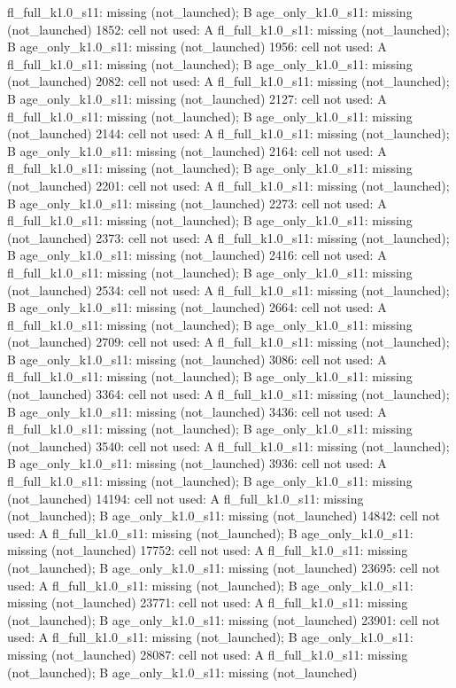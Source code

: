 \begin{table}[t]
{fl\_full\_k1.0\_s11: missing (not\_launched); B age\_only\_k1.0\_s11: missing (not\_launched) \textbar{} 1852: cell not used: A fl\_full\_k1.0\_s11: missing (not\_launched); B age\_only\_k1.0\_s11: missing (not\_launched) \textbar{} 1956: cell not used: A fl\_full\_k1.0\_s11: missing (not\_launched); B age\_only\_k1.0\_s11: missing (not\_launched) \textbar{} 2082: cell not used: A fl\_full\_k1.0\_s11: missing (not\_launched); B age\_only\_k1.0\_s11: missing (not\_launched) \textbar{} 2127: cell not used: A fl\_full\_k1.0\_s11: missing (not\_launched); B age\_only\_k1.0\_s11: missing (not\_launched) \textbar{} 2144: cell not used: A fl\_full\_k1.0\_s11: missing (not\_launched); B age\_only\_k1.0\_s11: missing (not\_launched) \textbar{} 2164: cell not used: A fl\_full\_k1.0\_s11: missing (not\_launched); B age\_only\_k1.0\_s11: missing (not\_launched) \textbar{} 2201: cell not used: A fl\_full\_k1.0\_s11: missing (not\_launched); B age\_only\_k1.0\_s11: missing (not\_launched) \textbar{} 2273: cell not used: A fl\_full\_k1.0\_s11: missing (not\_launched); B age\_only\_k1.0\_s11: missing (not\_launched) \textbar{} 2373: cell not used: A fl\_full\_k1.0\_s11: missing (not\_launched); B age\_only\_k1.0\_s11: missing (not\_launched) \textbar{} 2416: cell not used: A fl\_full\_k1.0\_s11: missing (not\_launched); B age\_only\_k1.0\_s11: missing (not\_launched) \textbar{} 2534: cell not used: A fl\_full\_k1.0\_s11: missing (not\_launched); B age\_only\_k1.0\_s11: missing (not\_launched) \textbar{} 2664: cell not used: A fl\_full\_k1.0\_s11: missing (not\_launched); B age\_only\_k1.0\_s11: missing (not\_launched) \textbar{} 2709: cell not used: A fl\_full\_k1.0\_s11: missing (not\_launched); B age\_only\_k1.0\_s11: missing (not\_launched) \textbar{} 3086: cell not used: A fl\_full\_k1.0\_s11: missing (not\_launched); B age\_only\_k1.0\_s11: missing (not\_launched) \textbar{} 3364: cell not used: A fl\_full\_k1.0\_s11: missing (not\_launched); B age\_only\_k1.0\_s11: missing (not\_launched) \textbar{} 3436: cell not used: A fl\_full\_k1.0\_s11: missing (not\_launched); B age\_only\_k1.0\_s11: missing (not\_launched) \textbar{} 3540: cell not used: A fl\_full\_k1.0\_s11: missing (not\_launched); B age\_only\_k1.0\_s11: missing (not\_launched) \textbar{} 3936: cell not used: A fl\_full\_k1.0\_s11: missing (not\_launched); B age\_only\_k1.0\_s11: missing (not\_launched) \textbar{} 14194: cell not used: A fl\_full\_k1.0\_s11: missing (not\_launched); B age\_only\_k1.0\_s11: missing (not\_launched) \textbar{} 14842: cell not used: A fl\_full\_k1.0\_s11: missing (not\_launched); B age\_only\_k1.0\_s11: missing (not\_launched) \textbar{} 17752: cell not used: A fl\_full\_k1.0\_s11: missing (not\_launched); B age\_only\_k1.0\_s11: missing (not\_launched) \textbar{} 23695: cell not used: A fl\_full\_k1.0\_s11: missing (not\_launched); B age\_only\_k1.0\_s11: missing (not\_launched) \textbar{} 23771: cell not used: A fl\_full\_k1.0\_s11: missing (not\_launched); B age\_only\_k1.0\_s11: missing (not\_launched) \textbar{} 23901: cell not used: A fl\_full\_k1.0\_s11: missing (not\_launched); B age\_only\_k1.0\_s11: missing (not\_launched) \textbar{} 28087: cell not used: A fl\_full\_k1.0\_s11: missing (not\_launched); B age\_only\_k1.0\_s11: missing (not\_launched) \textbar{} }
\end{table}
